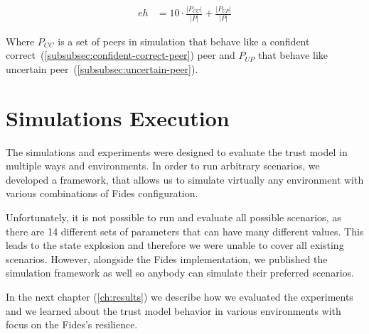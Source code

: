 \begin{equation}
    \begin{split}
    eh &= 10 \cdot \frac{|P_{CC}|}{|P|} + \frac{|P_{UP}|}{|P|}
    \end{split}
    \label{eq:environment_hardness}
\end{equation}

\noindent
Where $P_{CC}$ is a set of peers in simulation that behave like a confident correct~(\ref{subsubsec:confident-correct-peer}) peer and $P_{UP}$ that behave like uncertain peer~(\ref{subsubsec:uncertain-peer}).

\section{Simulations Execution}
\label{sec:simulations-execution}
The simulations and experiments were designed to evaluate the trust model in multiple ways and environments.
In order to run arbitrary scenarios, we developed a framework, that allows us to simulate virtually any environment with various combinations of Fides configuration.

Unfortunately, it is not possible to run and evaluate all possible scenarios, as there are 14 different sets of parameters that can have many different values.
This leads to the state explosion and therefore we were unable to cover all existing scenarios. 
However, alongside the Fides implementation, we published the simulation framework as well so anybody can simulate their preferred scenarios.

In the next chapter (\ref{ch:results}) we describe how we evaluated the experiments and we learned about the trust model behavior in various environments with focus on the Fides's resilience.